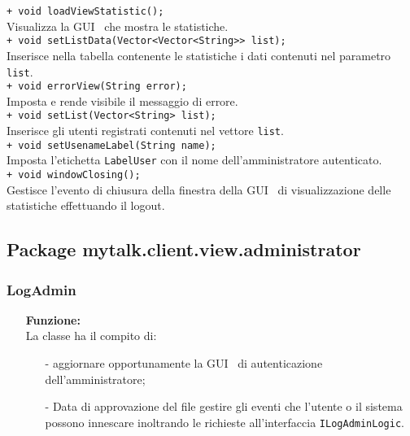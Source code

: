 {\begin{sloppypar}
{{{\begin{itemize}
				\texttt{+ void loadViewStatistic();}\\
				Visualizza la GUI\g~ che mostra le statistiche.\\
				
				\texttt{+ void setListData(Vector<Vector<String>> list);}\\
				Inserisce nella tabella contenente le statistiche i dati contenuti nel parametro \texttt{list}.\\
				
				\texttt{+ void errorView(String error);}\\
				Imposta e rende visibile il messaggio di errore.\\
				
				\texttt{+ void setList(Vector<String> list);}\\
				Inserisce gli utenti registrati contenuti nel vettore \texttt{list}.\\
				
				\texttt{+ void setUsenameLabel(String name);}\\
				Imposta l'etichetta \texttt{LabelUser} con il nome dell'amministratore autenticato.\\
				
				\texttt{+ void windowClosing();}\\
				Gestisce l'evento di chiusura della finestra della GUI\g~ di  visualizzazione delle statistiche effettuando il logout.\\
			\end{itemize}
			}
	}
	
	\subsection{Package mytalk.client.view.administrator} {
		
		\subsubsection{LogAdmin}\label{ssub:LogAdmin}{
			\begin{itemize}
				\item[]  \textbf{Funzione:} \\
				La classe ha il compito di:
				\begin{itemize}
					\item[-] aggiornare opportunamente la GUI\g~ di autenticazione dell'amministratore;
					\item[-] Data di approvazione del file gestire gli eventi che l'utente o il sistema possono innescare inoltrando le richieste all'interfaccia \texttt{ILogAdminLogic}.\\
				\end{itemize}
				

\end{itemize}}}}
\end{sloppypar}}
